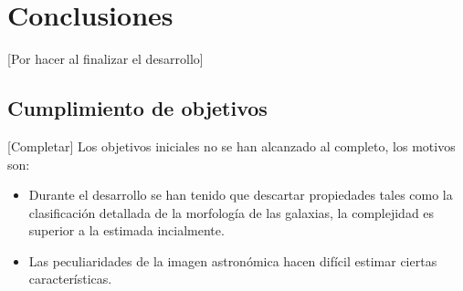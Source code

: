 	\section{Conclusiones}
	[Por hacer al finalizar el desarrollo]
	\subsection{Cumplimiento de objetivos}
	[Completar]
	Los objetivos iniciales no se han alcanzado al completo, los motivos son:\\
	\begin{itemize}
		\item Durante el desarrollo se han tenido que descartar propiedades tales como la clasificación detallada de la morfología de las galaxias, la complejidad es superior a la estimada incialmente.
		\item Las peculiaridades de la imagen astronómica hacen difícil estimar ciertas características.
	\end{itemize}
